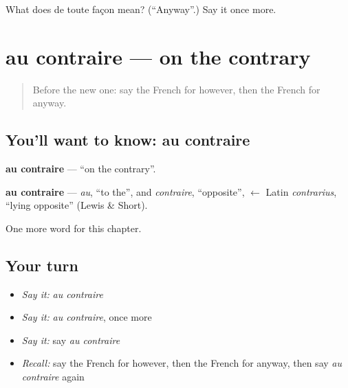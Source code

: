 \begin{tcolorbox}[breakable,colback=teal!4,colframe=teal!35!black,title={Before you move on}]
What does de toute façon mean? (\textquotedblleft{}Anyway\textquotedblright{}.) Say it once more.
\end{tcolorbox}
\section[au contraire]{au contraire — on the contrary}

\label{lesson:FR-C158-au-contraire}



\begin{quote}
Before the new one: say the French for however, then the French for anyway.
\end{quote}

\subsection*{You'll want to know: au contraire}
\textbf{au contraire} — \textquotedblleft{}on the contrary\textquotedblright{}.

\begin{cousinweb}
\textbf{au contraire} — \emph{au}, \textquotedblleft{}to the\textquotedblright{}, and \emph{contraire}, \textquotedblleft{}opposite\textquotedblright{}, $\leftarrow$ Latin \emph{contrarius}, \textquotedblleft{}lying opposite\textquotedblright{} (Lewis \& Short).
\end{cousinweb}

\begin{grammarlens}[title={What you've built}]
One more word for this chapter.
\end{grammarlens}

\subsection*{Your turn}
\begin{itemize}
\raggedright
  \item \emph{Say it:} \emph{au contraire}
  \item \emph{Say it:} \emph{au contraire}, once more
  \item \emph{Say it:} say \emph{au contraire}
  \item \emph{Recall:} say the French for however, then the French for anyway, then say \emph{au contraire} again
\end{itemize}

